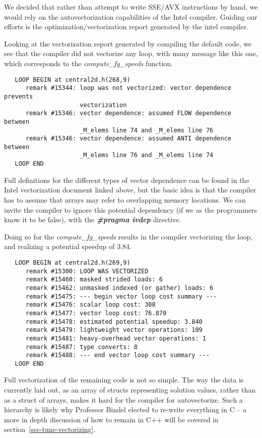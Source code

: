 We decided that rather than attempt to write SSE/AVX instructions by hand, we 
would rely on the autovectorization capabilities of the Intel compiler.
Guiding our efforts is the optimization/vectorization report generated by the intel
compiler.

Looking at the vectorization report generated by compiling the default code, we see
that the compiler did not vectorize any loop, with many message like this one, which
corresponds to the \emph{compute\_fg\_speeds} function.

\begin{lstlisting}
   LOOP BEGIN at central2d.h(268,9)
      remark #15344: loop was not vectorized: vector dependence prevents 
                     vectorization
      remark #15346: vector dependence: assumed FLOW dependence between 
                     _M_elems line 74 and _M_elems line 76
      remark #15346: vector dependence: assumed ANTI dependence between 
                     _M_elems line 76 and _M_elems line 74
   LOOP END
\end{lstlisting}

Full definitions for the different types of vector dependence can be found in the 
Intel vectorization document linked above,
but the basic idea is that the compiler has to assume that arrays may refer to
overlapping memory locations.  We can invite the compiler to ignore this potential
dependency (if we as the programmers know it to be false), with the
\textbf{\emph{\#pragma ivdep}} directive.

Doing so for the \emph{compute\_fg\_speeds} results in the compiler
vectorizing the loop, and realizing a potential speedup of 3.84.

\begin{lstlisting}
   LOOP BEGIN at central2d.h(269,9)
      remark #15300: LOOP WAS VECTORIZED
      remark #15460: masked strided loads: 6 
      remark #15462: unmasked indexed (or gather) loads: 6 
      remark #15475: --- begin vector loop cost summary ---
      remark #15476: scalar loop cost: 308 
      remark #15477: vector loop cost: 76.870 
      remark #15478: estimated potential speedup: 3.840 
      remark #15479: lightweight vector operations: 109 
      remark #15481: heavy-overhead vector operations: 1 
      remark #15487: type converts: 8 
      remark #15488: --- end vector loop cost summary ---
   LOOP END
\end{lstlisting}

Full vectorization of the remaining code is not so simple.  The way the data is 
currently laid out, as an array of structs representing solution values, rather
than as a struct of arrays, makes it hard for the compiler for autovectorize.
Such a hierarchy is likely why Professor Bindel elected to re-write everything
in C -- a more in depth discussion of how to remain in C++ will be covered in
section~\ref{sec-tune-vectorizing}.


